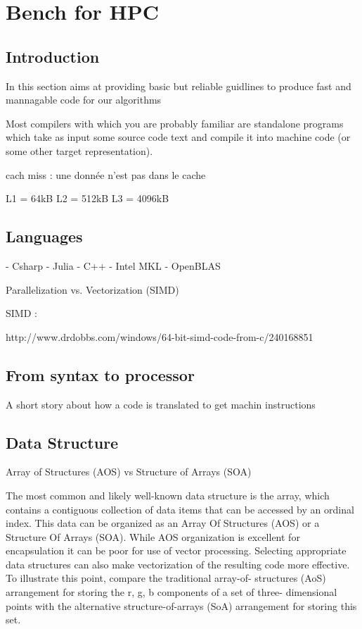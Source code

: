 \appendix
\chapter{Bench for HPC}

\section{Introduction}

In this section aims at providing basic but reliable guidlines to produce fast and mannagable code
for our algorithms

Most compilers with which you are probably familiar are standalone programs which take as input some source code text and compile it into machine code (or some other target representation).

cach miss : une donnée n'est pas dans le cache

\cite{Drepper2007}
\cite{Akanksha2012}

%
%

L1 = 64kB
L2 = 512kB
L3 = 4096kB

\section{Languages}
- Csharp
- Julia
- C++
- Intel MKL
- OpenBLAS

Parallelization vs. Vectorization (SIMD)

SIMD :

http://www.drdobbs.com/windows/64-bit-simd-code-from-c/240168851

\section{From syntax to processor}

A short story about how a code is translated to get machin instructions

\section{Data Structure}

Array of Structures (AOS) vs Structure of Arrays (SOA)

The most common and likely well-known data structure is the array, which contains a contiguous collection of data items that can be accessed by an ordinal index. This data can be organized as an Array Of Structures (AOS) or a Structure Of Arrays (SOA). While AOS organization is excellent for encapsulation it can be poor for use of vector processing. Selecting appropriate data structures can also make vectorization of the resulting code more effective. To illustrate this point, compare the traditional array-of- structures (AoS) arrangement for storing the r, g, b components of a set of three- dimensional points with the alternative structure-of-arrays (SoA) arrangement for storing this set.


